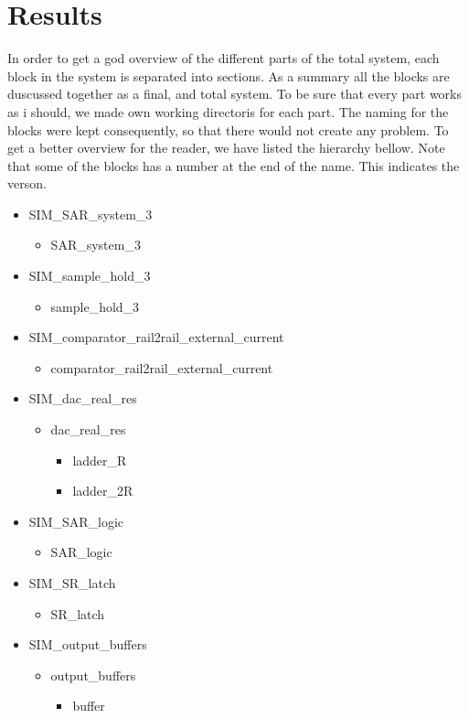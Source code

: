 \documentclass[english, 12pt, a4paper]{ifimaster}
\begin{document}
\chapter{Results} 
In order to get a god overview of the different parts of the total system, each block in the system is separated into sections. As a summary all the blocks are duscussed together as a final, and 
total system. To be sure that every part works as i should, we made own working directoris for each part. The naming for the blocks were kept consequently, so that there would not create any problem. 
To get a better overview for the reader, we have listed the hierarchy bellow. Note that some of the blocks has a number at the end of the name. This indicates the verson. 
\begin{itemize}
 \item SIM\_SAR\_system\_3
 \begin{itemize}
  \item SAR\_system\_3
 \end{itemize}
 \item SIM\_sample\_hold\_3
 \begin{itemize}
  \item sample\_hold\_3
 \end{itemize}
 \item SIM\_comparator\_rail2rail\_external\_current
 \begin{itemize}
  \item comparator\_rail2rail\_external\_current
 \end{itemize}
 \item SIM\_dac\_real\_res
  \begin{itemize}
    \item dac\_real\_res
    \begin{itemize}
        \item ladder\_R
        \item ladder\_2R
    \end{itemize}
 \end{itemize}
 \item SIM\_SAR\_logic
  \begin{itemize}
  \item SAR\_logic
 \end{itemize}
 \item SIM\_SR\_latch
  \begin{itemize}
  \item SR\_latch
 \end{itemize}
 \item SIM\_output\_buffers
  \begin{itemize}
    \item output\_buffers
        \begin{itemize}
            \item buffer
        \end{itemize}
 \end{itemize}
\end{itemize}
\end{document}
